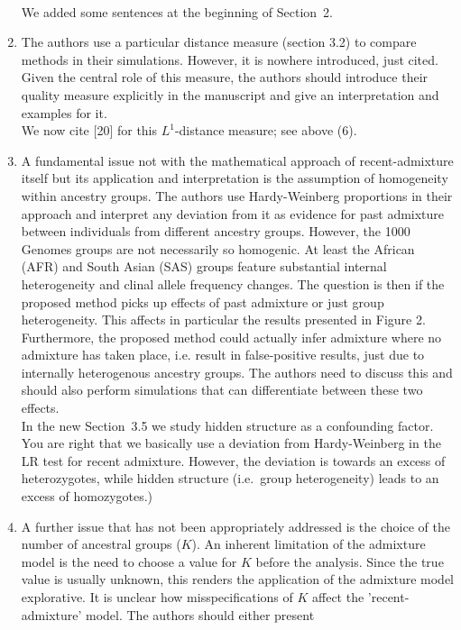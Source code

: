 \documentclass[12pt]{article}
\theoremstyle{definition}
\begin{document}
\begin{enumerate}
  \\
  {\color{blue} We added some sentences at the beginning of  Section~2.}
\item The authors use a particular distance measure (section 3.2) to compare methods in their simulations. However, it is nowhere  introduced, just cited. Given the central role of this measure, the authors should introduce their quality measure explicitly in the manuscript and give an interpretation and examples for it.
  \\
  {\color{blue} We now cite [20] for this $L^1$-distance measure; see above (6).}
\item A fundamental issue not with the mathematical approach of recent-admixture itself but its application and interpretation is the assumption of homogeneity within ancestry groups. The authors use Hardy-Weinberg proportions in their approach and interpret any deviation from it as evidence for past admixture between individuals
  from different ancestry groups. However, the 1000 Genomes groups are
  not necessarily so homogenic. At least the African (AFR) and South
  Asian (SAS) groups feature substantial internal heterogeneity and
  clinal allele frequency changes. The question is then if the
  proposed method picks up effects of past admixture or just group
  heterogeneity. This affects in particular the results presented in
  Figure 2. Furthermore, the proposed method could actually infer
  admixture where no admixture has taken place, i.e. result in
  false-positive results, just due to internally heterogenous ancestry
  groups. The authors need to discuss this and should also perform
  simulations that can differentiate between these two effects.
  \\
  {\color{blue} In the new Section~3.5 we study hidden structure as a confounding factor. You are right that we basically use a deviation from Hardy-Weinberg in the LR test for recent admixture. However, the deviation is towards an excess of heterozygotes, while hidden structure (i.e.\ group heterogeneity) leads to an excess of homozygotes.)}
\item A further issue that has not been appropriately addressed is the
  choice of the number of ancestral groups ($K$). An inherent
  limitation of the admixture model is the need to choose a value for
  $K$ before the analysis. Since the true value is usually unknown,
  this renders the application of the admixture model explorative. It
  is unclear how misspecifications of $K$ affect the
  'recent-admixture' model. The authors should either present

\end{enumerate}
\end{document}
